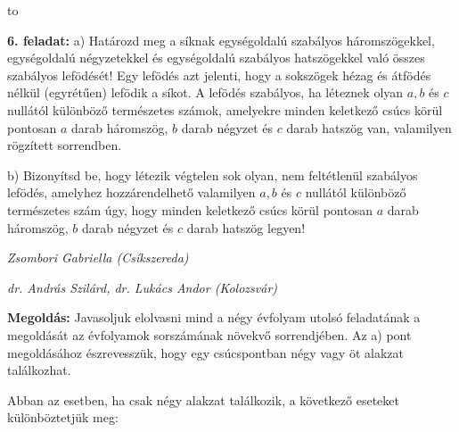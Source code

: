 \documentclass[a4paper,10pt]{article}
\newcommand{\ki}[2]{\hfill {\it #1 (#2)}\medskip}
\newcommand{\vonal}{\hbox to \hsize{\hskip2truecm\hrulefill\hskip2truecm}}
\begin{document}
\medskip

\vonal

{\bf 6. feladat: } a) Határozd meg a síknak egy\-ségoldalú szabályos
háromszögekkel, egy\-ség\-oldalú négyzetekkel és
egységoldalú sza\-bályos hatszögekkel való összes
szabályos le\-fö\-dé\-sét! Egy lefödés azt jelenti, hogy
a sokszögek hézag és átfödés nélkül (egyrétűen)
lefödik a síkot. A lefödés szabályos, ha léteznek olyan
$a,b$ és $c$ nullától különböző természetes
számok, amelyekre minden keletkező csúcs körül pontosan
$a$ darab háromszög, $b$ darab négyzet és $c$ darab
hatszög van, valamilyen rögzített sorrendben.

b) Bizonyítsd be, hogy létezik végtelen sok olyan, nem
fel\-tétle\-nül szabályos lefödés, a\-mely\-hez
hozzárendelhető valamilyen $a,b$ és $c$ nullától
különböző természetes szám úgy, hogy minden
keletkező csúcs körül pontosan $a$ darab háromszög, $b$
darab négyzet és $c$ darab hatszög legyen!

\ki{Zsombori Gabriella}{Csíkszereda}

\ki{dr. András Szilárd, dr. Lukács Andor}{Kolozsvár}\medskip

{\bf Megoldás: } Javasoljuk elolvasni mind a négy évfolyam utolsó feladatának
a megoldását az évfolyamok sorszámának nö\-vek\-vő
sorrendjében. Az a) pont megoldásához észrevesszük,  hogy
egy csúcs\-pontban négy vagy öt alakzat találkozhat.

Abban az esetben, ha csak négy alakzat találkozik, a
következő eseteket különböztetjük meg:
\end{document}
